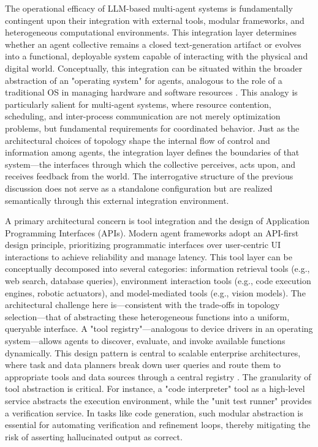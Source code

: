 \documentclass[11pt,a4paper]{article}
\begin{document}
The operational efficacy of LLM-based multi-agent systems is fundamentally contingent upon their integration with external tools, modular frameworks, and heterogeneous computational environments. This integration layer determines whether an agent collective remains a closed text-generation artifact or evolves into a functional, deployable system capable of interacting with the physical and digital world. Conceptually, this integration can be situated within the broader abstraction of an "operating system" for agents, analogous to the role of a traditional OS in managing hardware and software resources \cite{arxiv:2312.03815v2}. This analogy is particularly salient for multi-agent systems, where resource contention, scheduling, and inter-process communication are not merely optimization problems, but fundamental requirements for coordinated behavior. Just as the architectural choices of topology shape the internal flow of control and information among agents, the integration layer defines the boundaries of that system---the interfaces through which the collective perceives, acts upon, and receives feedback from the world. The interrogative structure of the previous discussion does not serve as a standalone configuration but are realized semantically through this external integration environment.

A primary architectural concern is tool integration and the design of Application Programming Interfaces (APIs). Modern agent frameworks adopt an API-first design principle, prioritizing programmatic interfaces over user-centric UI interactions to achieve reliability and manage latency. This tool layer can be conceptually decomposed into several categories: information retrieval tools (e.g., web search, database queries), environment interaction tools (e.g., code execution engines, robotic actuators), and model-mediated tools (e.g., vision models). The architectural challenge here is---consistent with the trade-offs in topology selection---that of abstracting these heterogeneous functions into a uniform, queryable interface. A "tool registry"---analogous to device drivers in an operating system---allows agents to discover, evaluate, and invoke available functions dynamically. This design pattern is central to scalable enterprise architectures, where task and data planners break down user queries and route them to appropriate tools and data sources through a central registry \cite{arxiv:2406.00584v1}. The granularity of tool abstraction is critical. For instance, a "code interpreter" tool as a high-level service abstracts the execution environment, while the "unit test runner" provides a verification service. In tasks like code generation, such modular abstraction is essential for automating verification and refinement loops, thereby mitigating the risk of asserting hallucinated output as correct.
\end{document}

